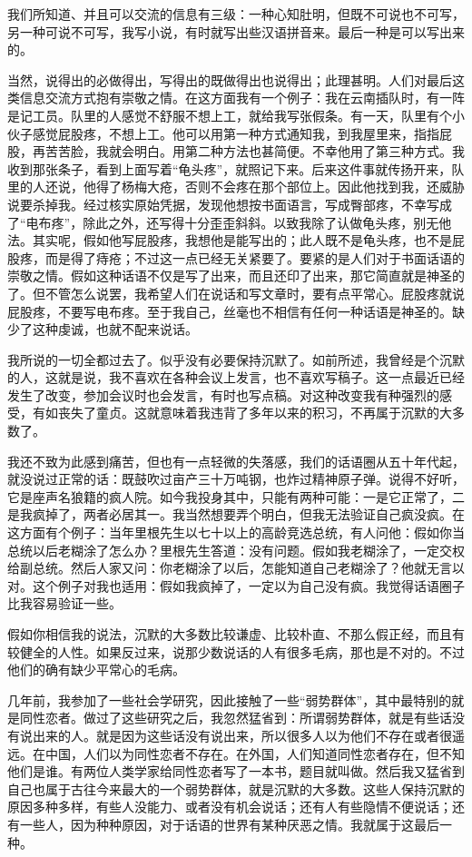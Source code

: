我们所知道、并且可以交流的信息有三级：一种心知肚明，但既不可说也不可写，另一种可说不可写，我写小说，有时就写出些汉语拼音来。最后一种是可以写出来的。 

当然，说得出的必做得出，写得出的既做得出也说得出；此理甚明。人们对最后这类信息交流方式抱有崇敬之情。在这方面我有一个例子：我在云南插队时，有一阵是记工员。队里的人感觉不舒服不想上工，就给我写张假条。有一天，队里有个小伙子感觉屁股疼，不想上工。他可以用第一种方式通知我，到我屋里来，指指屁股，再苦苦脸，我就会明白。用第二种方法也甚简便。不幸他用了第三种方式。我收到那张条子，看到上面写着“龟头疼”，就照记下来。后来这件事就传扬开来，队里的人还说，他得了杨梅大疮，否则不会疼在那个部位上。因此他找到我，还威胁说要杀掉我。经过核实原始凭据，发现他想按书面语言，写成臀部疼，不幸写成了“电布疼”，除此之外，还写得十分歪歪斜斜。以致我除了认做龟头疼，别无他法。其实呢，假如他写屁股疼，我想他是能写出的；此人既不是龟头疼，也不是屁股疼，而是得了痔疮；不过这一点已经无关紧要了。要紧的是人们对于书面话语的崇敬之情。假如这种话语不仅是写了出来，而且还印了出来，那它简直就是神圣的了。但不管怎么说罢，我希望人们在说话和写文章时，要有点平常心。屁股疼就说屁股疼，不要写电布疼。至于我自己，丝毫也不相信有任何一种话语是神圣的。缺少了这种虔诚，也就不配来说话。 

我所说的一切全都过去了。似乎没有必要保持沉默了。如前所述，我曾经是个沉默的人，这就是说，我不喜欢在各种会议上发言，也不喜欢写稿子。这一点最近已经发生了改变，参加会议时也会发言，有时也写点稿。对这种改变我有种强烈的感受，有如丧失了童贞。这就意味着我违背了多年以来的积习，不再属于沉默的大多数了。 

我还不致为此感到痛苦，但也有一点轻微的失落感，我们的话语圈从五十年代起，就没说过正常的话：既鼓吹过亩产三十万吨钢，也炸过精神原子弹。说得不好听，它是座声名狼籍的疯人院。如今我投身其中，只能有两种可能：一是它正常了，二是我疯掉了，两者必居其一。我当然想要弄个明白，但我无法验证自己疯没疯。在这方面有个例子：当年里根先生以七十以上的高龄竞选总统，有人问他：假如你当总统以后老糊涂了怎么办？里根先生答道：没有问题。假如我老糊涂了，一定交权给副总统。然后人家又问：你老糊涂了以后，怎能知道自己老糊涂了？他就无言以对。这个例子对我也适用：假如我疯掉了，一定以为自己没有疯。我觉得话语圈子比我容易验证一些。 

假如你相信我的说法，沉默的大多数比较谦虚、比较朴直、不那么假正经，而且有较健全的人性。如果反过来，说那少数说话的人有很多毛病，那也是不对的。不过他们的确有缺少平常心的毛病。 

几年前，我参加了一些社会学研究，因此接触了一些“弱势群体”，其中最特别的就是同性恋者。做过了这些研究之后，我忽然猛省到：所谓弱势群体，就是有些话没有说出来的人。就是因为这些话没有说出来，所以很多人以为他们不存在或者很遥远。在中国，人们以为同性恋者不存在。在外国，人们知道同性恋者存在，但不知他们是谁。有两位人类学家给同性恋者写了一本书，题目就叫做。然后我又猛省到自己也属于古往今来最大的一个弱势群体，就是沉默的大多数。这些人保持沉默的原因多种多样，有些人没能力、或者没有机会说话；还有人有些隐情不便说话；还有一些人，因为种种原因，对于话语的世界有某种厌恶之情。我就属于这最后一种。 

